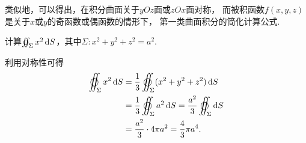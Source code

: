 类似地，可以得出，在积分曲面关于\(yOz\)面或\(zOx\)面对称，
而被积函数\(f(x,y,z)\)是关于\(x\)或\(y\)的奇函数或偶函数的情形下，
第一类曲面积分的简化计算公式.

\begin{example}
计算\(\varoiint_\Sigma x^2 \dd{S}\)，其中\(\Sigma: x^2+y^2+z^2=a^2\).
\begin{solution}
利用对称性可得\begin{align*}
	\varoiint_\Sigma x^2 \dd{S}
	&= \frac{1}{3} \varoiint_\Sigma (x^2+y^2+z^2) \dd{S} \\
	&= \frac{1}{3} \varoiint_\Sigma a^2 \dd{S}
	= \frac{a^2}{3} \varoiint_\Sigma \dd{S} \\
	&= \frac{a^2}{3} \cdot 4\pi a^2
	= \frac{4}{3} \pi a^4.
\end{align*}
\end{solution}
\end{example}
